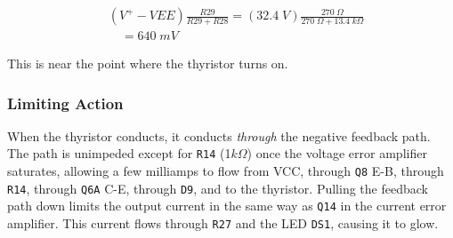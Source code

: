 \begin{multicols}{2}
\begin{align*}
    &(V^+ - VEE)\frac{R29}{R29+R28} = (32.4\;V)\frac{270\;\Omega}{270\;\Omega + 13.4\;k\Omega} \\
    &\quad {}= 640\;mV
\end{align*}

This is near the point where the thyristor turns on.

\subsubsection{Limiting Action}
When the thyristor conducts, it conducts \emph{through} the negative feedback
path. The path is unimpeded except for \texttt{R14} (1\;$k\Omega$) once the
voltage error amplifier saturates, allowing a few milliamps to flow from VCC,
through \texttt{Q8} E-B, through \texttt{R14}, through \texttt{Q6A} C-E, through
\texttt{D9}, and to the thyristor. Pulling the feedback path down limits the
output current in the same way as \texttt{Q14} in the current error amplifier.
This current flows through \texttt{R27} and the LED \texttt{DS1}, causing it
to glow.

\end{multicols}
